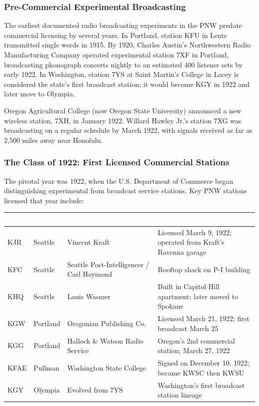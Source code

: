 \documentclass[11pt,letterpaper]{article}
\newcommand{\tableheader}[1]{\textbf{\sffamily\textcolor{white}{#1}}}
\begin{document}
\subsubsection{Pre-Commercial Experimental Broadcasting}

The earliest documented radio broadcasting experiments in the PNW predate commercial licensing by several years. In Portland, station KFU in Lents transmitted single words in 1915. By 1920, Charles Austin's Northwestern Radio Manufacturing Company operated experimental station 7XF in Portland, broadcasting phonograph concerts nightly to an estimated 400 listener sets by early 1922. In Washington, station 7YS at Saint Martin's College in Lacey is considered the state's first broadcast station; it would become KGY in 1922 and later move to Olympia.

Oregon Agricultural College (now Oregon State University) announced a new wireless station, 7XH, in January 1922. Willard Hawley Jr.'s station 7XG was broadcasting on a regular schedule by March 1922, with signals received as far as 2,500 miles away near Honolulu.

\subsubsection{The Class of 1922: First Licensed Commercial Stations}

The pivotal year was 1922, when the U.S. Department of Commerce began distinguishing experimental from broadcast service stations. Key PNW stations licensed that year include:

\begin{center}
\begin{tabularx}{\textwidth}{L{1.5cm}L{2.5cm}XL{3cm}}
\toprule
{}
\tableheader{Call} & \tableheader{City} & \tableheader{Owner/Operator} & \tableheader{Notable Details} \\
\midrule
KJR & Seattle & Vincent Kraft & Licensed March 9, 1922; operated from Kraft's Ravenna garage \\
KFC & Seattle & Seattle Post-Intelligencer / Carl Haymond & Rooftop shack on P-I building \\
KHQ & Seattle & Louis Wasmer & Built in Capitol Hill apartment; later moved to Spokane \\
KGW & Portland & Oregonian Publishing Co. & Licensed March 21, 1922; first broadcast March 25 \\
KGG & Portland & Hallock \& Watson Radio Service & Oregon's 2nd commercial station; March 27, 1922 \\
KFAE & Pullman & Washington State College & Signed on December 10, 1922; became KWSC then KWSU \\
KGY & Olympia & Evolved from 7YS & Washington's first broadcast station lineage \\
\bottomrule
\end{tabularx}
\end{center}
\end{document}
